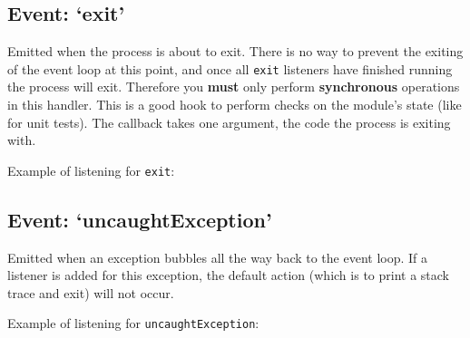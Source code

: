 \subsection{Event: `exit'}\label{event-exit}

Emitted when the process is about to exit. There is no way to prevent
the exiting of the event loop at this point, and once all \texttt{exit}
listeners have finished running the process will exit. Therefore you
\textbf{must} only perform \textbf{synchronous} operations in this
handler. This is a good hook to perform checks on the module's state
(like for unit tests). The callback takes one argument, the code the
process is exiting with.

Example of listening for \texttt{exit}:

\begin{Shaded}
\begin{Highlighting}[]
\NormalTok{(}\NormalTok{, }
  \NormalTok{(}\NormalTok{() \{}
    \NormalTok{(}\NormalTok{);}
  \NormalTok{\}, }\NormalTok{);}
  \NormalTok{(}
\NormalTok{\});}
\end{Highlighting}
\end{Shaded}

\subsection{Event: `uncaughtException'}\label{event-uncaughtexception}

Emitted when an exception bubbles all the way back to the event loop. If
a listener is added for this exception, the default action (which is to
print a stack trace and exit) will not occur.

Example of listening for \texttt{uncaughtException}:

\begin{Shaded}
\begin{Highlighting}[]
\NormalTok{(}\NormalTok{, }
  \NormalTok{(} 
\NormalTok{\});}

\NormalTok{(}\NormalTok{() \{}
  \NormalTok{(}\NormalTok{);}
\NormalTok{\}, }\NormalTok{);}

\NormalTok{();}
\NormalTok{(}\NormalTok{);}
\end{Highlighting}
\end{Shaded}

